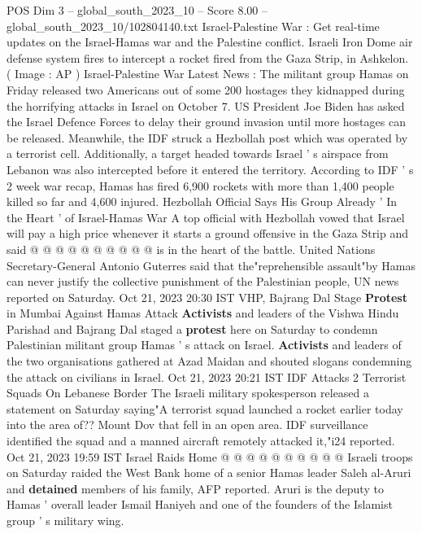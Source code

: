\begin{textsample}{POS Dim 3 – global\_south\_2023\_10 – Score 8.00 – global\_south\_2023\_10/102804140.txt}  \label{ex:f3_pos_436}
Israel-Palestine War : Get real-time updates on the Israel-Hamas war and the Palestine conflict.
Israeli Iron Dome air defense system fires to intercept a rocket fired from the Gaza Strip, in Ashkelon. ( Image : AP ) Israel-Palestine War Latest News : The militant group Hamas on Friday released two Americans out of some 200 hostages they kidnapped during the horrifying attacks in Israel on October 7.
US President Joe Biden has asked the Israel Defence Forces to delay their ground invasion until more hostages can be released.
Meanwhile, the IDF struck a Hezbollah post which was operated by a terrorist cell.
Additionally, a target headed towards Israel ' s airspace from Lebanon was also intercepted before it entered the territory.
According to IDF ' s 2 week war recap, Hamas has fired 6,900 rockets with more than 1,400 people killed so far and 4,600 injured.
Hezbollah Official Says His Group Already ' In the Heart ' of Israel-Hamas War A top official with Hezbollah vowed that Israel will pay a high price whenever it starts a ground offensive in the Gaza Strip and said @ @ @ @ @ @ @ @ @ @ is in the heart of the battle.
United Nations Secretary-General Antonio Guterres said that the"reprehensible assault"by Hamas can never justify the collective punishment of the Palestinian people, UN news reported on Saturday.
Oct 21, 2023 20:30 IST VHP, Bajrang Dal Stage \textbf{Protest} in Mumbai Against Hamas Attack \textbf{Activists} and leaders of the Vishwa Hindu Parishad and Bajrang Dal staged a \textbf{protest} here on Saturday to condemn Palestinian militant group Hamas ' s attack on Israel. \textbf{Activists} and leaders of the two organisations gathered at Azad Maidan and shouted slogans condemning the attack on civilians in Israel.
Oct 21, 2023 20:21 IST IDF Attacks 2 Terrorist Squads On Lebanese Border The Israeli military spokesperson released a statement on Saturday saying"A terrorist squad launched a rocket earlier today into the area of??
Mount Dov that fell in an open area.
IDF surveillance identified the squad and a manned aircraft remotely attacked it,"i24 reported.
Oct 21, 2023 19:59 IST Israel Raids Home @ @ @ @ @ @ @ @ @ @ Israeli troops on Saturday raided the West Bank home of a senior Hamas leader Saleh al-Aruri and \textbf{detained} members of his family, AFP reported.
Aruri is the deputy to Hamas ' overall leader Ismail Haniyeh and one of the founders of the Islamist group ' s military wing.

\end{textsample}
